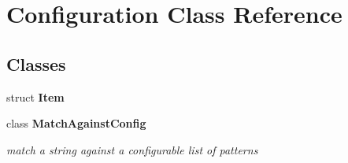 \section{\-Configuration \-Class \-Reference}
\label{classConfiguration}
\subsection*{\-Classes}
\begin{DoxyCompactItemize}
\item 
struct {\bf \-Item}
\item 
class {\bf \-Match\-Against\-Config}
\begin{DoxyCompactList}\small\item\em match a string against a configurable list of patterns \end{DoxyCompactList}\end{DoxyCompactItemize}
